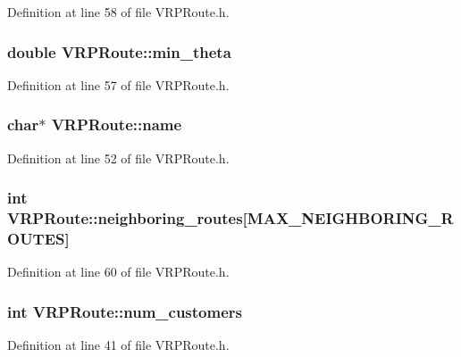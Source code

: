 Definition at line 58 of file VRPRoute.h.

\hypertarget{class_v_r_p_route_a623d67983d2db8b6a5a66789e5d0cf13}{
\subsubsection[{min\_\-theta}]{\setlength{\rightskip}{0pt plus 5cm}double {\bf VRPRoute::min\_\-theta}}}
\label{class_v_r_p_route_a623d67983d2db8b6a5a66789e5d0cf13}


Definition at line 57 of file VRPRoute.h.

\hypertarget{class_v_r_p_route_a6dffc050d629bc3ab6069cd450382417}{
\subsubsection[{name}]{\setlength{\rightskip}{0pt plus 5cm}char$\ast$ {\bf VRPRoute::name}}}
\label{class_v_r_p_route_a6dffc050d629bc3ab6069cd450382417}


Definition at line 52 of file VRPRoute.h.

\hypertarget{class_v_r_p_route_a360d284927652d9925ab2eac9dbc3ee4}{
\subsubsection[{neighboring\_\-routes}]{\setlength{\rightskip}{0pt plus 5cm}int {\bf VRPRoute::neighboring\_\-routes}\mbox{[}MAX\_\-NEIGHBORING\_\-ROUTES\mbox{]}}}
\label{class_v_r_p_route_a360d284927652d9925ab2eac9dbc3ee4}


Definition at line 60 of file VRPRoute.h.

\hypertarget{class_v_r_p_route_af18e40acb0d146fca047ad56457c772f}{
\subsubsection[{num\_\-customers}]{\setlength{\rightskip}{0pt plus 5cm}int {\bf VRPRoute::num\_\-customers}}}
\label{class_v_r_p_route_af18e40acb0d146fca047ad56457c772f}


Definition at line 41 of file VRPRoute.h.


